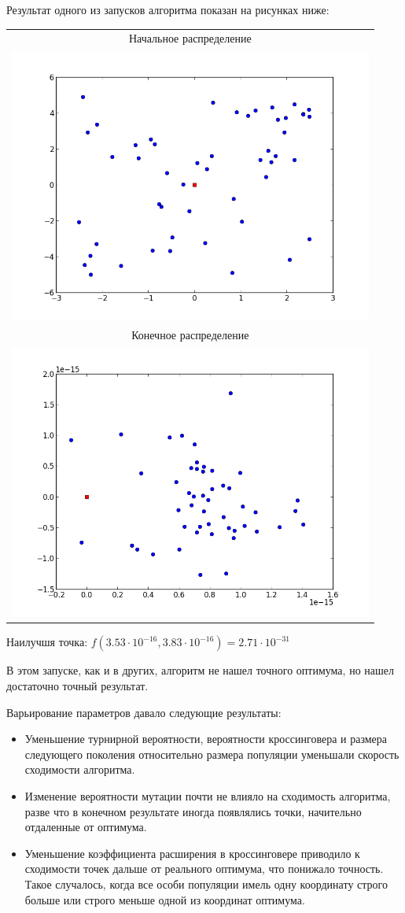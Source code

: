 \documentclass[a4paper]{article}
\begin{document}
Результат одного из запусков алгоритма показан на рисунках ниже: 

\begin{tabular}{c}
Начальное распределение \\
\includegraphics[width=12cm]{start.png} \\
Конечное распределение  \\
\includegraphics[width=12cm]{end.png}
\end{tabular}

Наилучшя точка: $f(3.53 \cdot 10^{-16}, 3.83 \cdot 10^{-16}) = 2.71 \cdot 10^{-31}$

В этом запуске, как и в других, алгоритм не нашел точного оптимума, но нашел достаточно точный результат.

Варьирование параметров давало следующие результаты:
\begin{itemize}
\item Уменьшение турнирной вероятности, вероятности кроссинговера и размера следующего поколения относительно размера популяции уменьшали скорость сходимости алгоритма.
\item Изменение вероятности мутации почти не влияло на сходимость алгоритма, разве что в конечном результате иногда появлялись точки, начительно отдаленные от оптимума.
\item Уменьшение коэффициента расширения в кроссинговере приводило к сходимости точек дальше от реального оптимума, что понижало точность. Такое случалось, когда все особи популяции имель одну координату строго больше или строго меньше одной из координат оптимума.
\end{itemize}
\end{document}
